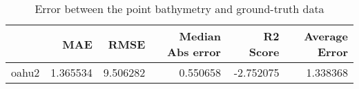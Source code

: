 \begin{table}[h!]
\caption{Error between the point bathymetry and ground-truth data}
\label{tab:oahu2_lidar_error}
\begin{tabular}{lrrrrr}
\toprule
 & MAE & RMSE & Median Abs error & R2 Score & Average Error \\
\midrule
oahu2 & 1.365534 & 9.506282 & 0.550658 & -2.752075 & 1.338368 \\
\bottomrule
\end{tabular}
\end{table}

